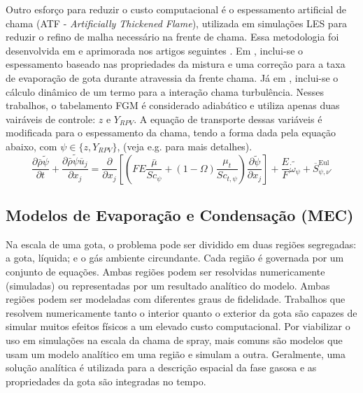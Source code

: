 Outro esforço para reduzir o custo computacional é o espessamento artificial de chama (ATF - \emph{Artificially Thickened Flame}), utilizada em simulações LES para reduzir o refino de malha necessário na frente de chama.
Essa metodologia foi desenvolvida em \cite{SacomanoF2017PhD} e aprimorada nos artigos seguintes \cite{SacomanoF2017CF, SacomanoF2020CF}.
Em \cite{SacomanoF2017CF}, inclui-se o espessamento baseado nas propriedades da mistura e uma correção para a taxa de evaporação de gota durante atravessia da frente chama.
Já em \cite{SacomanoF2020CF}, inclui-se o cálculo dinâmico de um termo para a interação chama turbulência.
Nesses trabalhos, o tabelamento FGM é considerado adiabático e utiliza apenas duas vairáveis de controle: $z$ e $Y_{RPV}$.
A equação de transporte dessas variáveis é modificada para o 
espessamento da chama, tendo a forma dada pela equação abaixo, com $\psi \in \lbrace z, Y_{RPV}\rbrace$, (veja e.g. \cite{SacomanoF2017CF} para mais detalhes).
\begin{equation}
    \frac{\partial \bar \rho \widetilde \psi}{\partial t} + 
    \frac{\partial \bar \rho \widetilde \psi \overline u_j}{\partial x_j} =
    \frac{\partial }{\partial x_j} \left[ \left(
    FE \frac{\bar\mu}{Sc_\psi} + (1-\Omega)\frac{\mu_t}{Sc_{t,\psi}}
    \right) \frac{\partial \widetilde \psi}{\partial x_j}
    \right] +
    \frac{E}{F}\widetilde{\dot{\omega}_\psi} + 
    \overline S_{\psi,\nu'}^{\text{Eul}}
\end{equation}


\subsection{Modelos de Evaporação e Condensação (MEC)} \label{sec:MEC}


Na escala de uma gota, o problema pode ser dividido em duas regiões segregadas: a gota, líquida; e o gás ambiente circundante. 
Cada região é governada por um conjunto de equações.
Ambas regiões podem ser resolvidas numericamente (simuladas) ou representadas por um resultado analítico do modelo.
Ambas regiões podem ser modeladas com diferentes graus de fidelidade.
Trabalhos que resolvem numericamente tanto o interior quanto o exterior da gota são capazes de simular muitos efeitos físicos a um elevado custo computacional. %
Por viabilizar o uso em simulações na escala da chama de spray, mais comuns são modelos que usam um modelo analítico em uma região e simulam a outra.
Geralmente, uma solução analítica é utilizada para a descrição espacial da fase gasosa e as propriedades da gota são integradas no tempo. 


